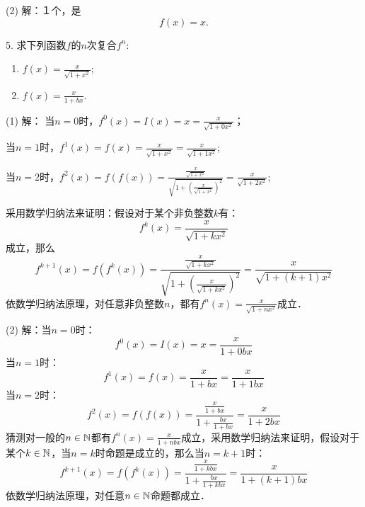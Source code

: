 (2) 解：１个，是
\begin{equation}
    f(x) = x.
\end{equation}

5. 求下列函数$f$的$n$次复合$f^n$:

\begin{enumerate}
    \item $f(x) = \displaystyle\frac{x}{\displaystyle\sqrt{1+x^2}}$;
    \item $f(x) = \displaystyle\frac{x}{1+bx}$.
\end{enumerate}

(1) 解：
当$n = 0$时，$f^0 (x) = I (x) = x = \displaystyle\frac{x}{\displaystyle\sqrt{1+0 x^2}}$；

当$n=1$时，$f^1 (x) = f(x) = \displaystyle\frac{x}{\displaystyle\sqrt{1+x^2}}=\displaystyle\frac{x}{\displaystyle\sqrt{1+1 x^2}}$;

当$n=2$时，$f^2 (x) = f(f(x)) = \displaystyle\frac{\displaystyle\frac{x}{\displaystyle\sqrt{1+x^2}}}{\displaystyle\sqrt{1+\left(\displaystyle\frac{x}{\displaystyle\sqrt{1+x^2}}\right)^2}} = \displaystyle\frac{x}{\displaystyle\sqrt{1+2x^2}}$;

采用数学归纳法来证明：假设对于某个非负整数$k$有：
\begin{equation}
    f^k (x) = \frac{x}{\sqrt{1+kx^2}}
\end{equation}
成立，那么
\begin{equation}
    f^{k+1}(x) = f(f^k(x)) = \frac{\displaystyle\frac{x}{\sqrt{1+kx^2}}}{\sqrt{1+\left(\displaystyle\frac{x}{\sqrt{1+kx^2}}\right)^2}} = \frac{x}{\sqrt{1+(k+1)x^2}}
\end{equation}
依数学归纳法原理，对任意非负整数$n$，都有$f^n (x) = \displaystyle\frac{x}{\displaystyle\sqrt{1+nx^2}}$成立．

(2) 解：当$n=0$时：
\begin{equation}
    f^0 (x) = I(x) = x = \frac{x}{1 + 0bx}
\end{equation}
当$n=1$时：
\begin{equation}
    f^1 (x) = f(x) = \frac{x}{1+bx} = \frac{x}{1+1bx}
\end{equation}
当$n=2$时：
\begin{equation}
    f^2 (x) = f(f(x)) = \frac{\displaystyle\frac{x}{1+bx}}{1+\displaystyle\frac{bx}{1+bx}} = \displaystyle\frac{x}{1+2bx}
\end{equation}
猜测对一般的$n \in \mathbb{N}$都有$f^n (x) = \displaystyle\frac{x}{1+nbx}$成立，采用数学归纳法来证明，假设对于某个$k \in \mathbb{N}$，当$n=k$时命题是成立的，那么当$n=k+1$时：
\begin{equation}
    f^{k+1}(x) = f(f^k (x)) = \displaystyle\frac{\displaystyle\frac{x}{1+kbx}}{1+\displaystyle\frac{bx}{1+kbx}} = \displaystyle\frac{x}{1+(k+1)bx}
\end{equation}
依数学归纳法原理，对任意$n \in \mathbb{N}$命题都成立．

